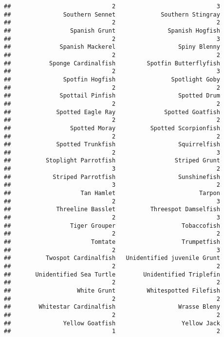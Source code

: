 \documentclass[
]{article}
\begin{document}
\begin{verbatim}
##                             2                             3 
##               Southern Sennet             Southern Stingray 
##                             2                             2 
##                 Spanish Grunt               Spanish Hogfish 
##                             2                             3 
##              Spanish Mackerel                  Spiny Blenny 
##                             2                             2 
##           Sponge Cardinalfish         Spotfin Butterflyfish 
##                             2                             3 
##               Spotfin Hogfish                Spotlight Goby 
##                             2                             2 
##              Spottail Pinfish                  Spotted Drum 
##                             2                             2 
##             Spotted Eagle Ray              Spotted Goatfish 
##                             2                             2 
##                 Spotted Moray          Spotted Scorpionfish 
##                             2                             2 
##             Spotted Trunkfish                  Squirrelfish 
##                             2                             3 
##          Stoplight Parrotfish                 Striped Grunt 
##                             3                             2 
##            Striped Parrotfish                  Sunshinefish 
##                             3                             2 
##                    Tan Hamlet                        Tarpon 
##                             2                             3 
##             Threeline Basslet          Threespot Damselfish 
##                             2                             3 
##                 Tiger Grouper                   Tobaccofish 
##                             2                             2 
##                       Tomtate                   Trumpetfish 
##                             2                             3 
##          Twospot Cardinalfish   Unidentified juvenile Grunt 
##                             2                             2 
##       Unidentified Sea Turtle        Unidentified Triplefin 
##                             2                             2 
##                   White Grunt         Whitespotted Filefish 
##                             2                             2 
##        Whitestar Cardinalfish                  Wrasse Bleny 
##                             2                             2 
##               Yellow Goatfish                   Yellow Jack 
##                             1                             2 

\end{verbatim}
\end{document}

